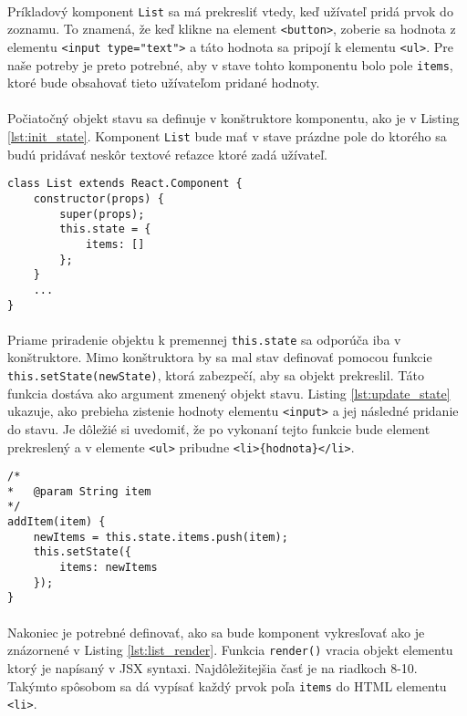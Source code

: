 \paragraph{}
Príkladový komponent \texttt{List} sa má prekresliť vtedy, keď užívateľ pridá prvok do zoznamu. To znamená, že keď klikne na element \texttt{<button>}, zoberie sa hodnota z elementu \texttt{<input type="text">} a táto hodnota sa pripojí k elementu \texttt{<ul>}. Pre naše potreby je preto potrebné, aby v stave tohto komponentu bolo pole \texttt{items}, ktoré bude obsahovať tieto užívateľom pridané hodnoty.

\paragraph{}
Počiatočný objekt stavu sa definuje v konštruktore komponentu, ako je v Listing \ref{lst:init_state}. Komponent \texttt{List} bude mať v stave prázdne pole do ktorého sa budú pridávať neskôr textové reťazce ktoré zadá užívateľ.

\begin{lstlisting}[caption={Definovanie stavu v konštruktore komponentu},label={lst:init_state}]
class List extends React.Component {
	constructor(props) {
		super(props);
		this.state = {
			items: []
		};
	}
	...
}
\end{lstlisting}

\paragraph{}
Priame priradenie objektu k premennej \texttt{this.state} sa odporúča iba v konštruktore. Mimo konštruktora by sa mal stav definovať pomocou funkcie \texttt{this.setState(newState)}, ktorá zabezpečí, aby sa objekt prekreslil. Táto funkcia dostáva ako argument zmenený objekt stavu. Listing \ref{lst:update_state} ukazuje, ako prebieha zistenie hodnoty elementu \texttt{<input>} a jej následné pridanie do stavu. Je dôležié si uvedomiť, že po vykonaní tejto funkcie bude element prekreslený a v elemente \texttt{<ul>} pribudne \texttt{<li>\{hodnota\}</li>}.

\begin{lstlisting}[caption={Zmena stavu komponentu pomocou funkcie \texttt{this.setState()}},label={lst:update_state}]
/*
*	@param String item
*/
addItem(item) {
	newItems = this.state.items.push(item);
	this.setState({
		items: newItems
	});
}
\end{lstlisting}

\paragraph{}
Nakoniec je potrebné definovať, ako sa bude komponent vykresľovať ako je znázornené v Listing \ref{lst:list_render}. Funkcia \texttt{render()} vracia objekt elementu ktorý je napísaný v JSX syntaxi. Najdôležitejšia časť je na riadkoch 8-10. Takýmto spôsobom sa dá vypísať každý prvok poľa \texttt{items} do HTML elementu \texttt{<li>}.

